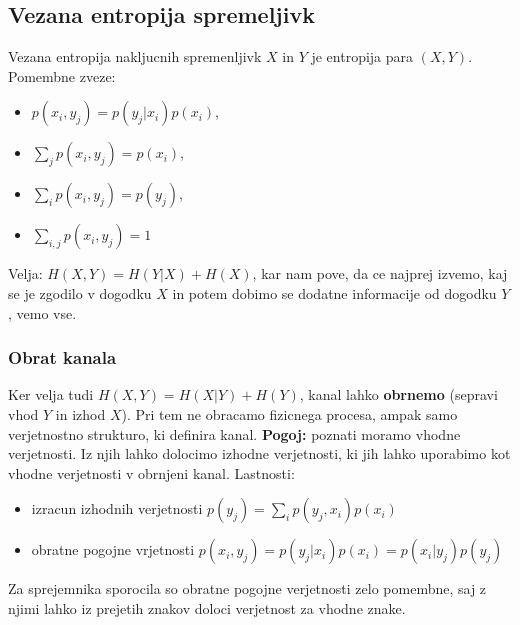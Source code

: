 \documentclass{article}
\begin{document}
\begin{multicols}{3}
\subsection{Vezana entropija spremeljivk}
Vezana entropija nakljucnih spremenljivk $X$ in $Y$ je entropija para $(X, Y)$.
Pomembne zveze:
\begin{itemize}
    \item $p(x_i, y_j) = p(y_j| x_i)p(x_i)$,
    \item $\sum_j p(x_i, y_j) = p(x_i)$,
    \item $\sum_i p(x_i, y_j) = p(y_j)$,
    \item $\sum_{i,j} p(x_i, y_j) = 1$
\end{itemize}
Velja: $H(X, Y) = H(Y|X) + H(X)$, kar nam pove, da ce najprej izvemo, kaj se je zgodilo v dogodku $X$ in potem
dobimo se dodatne informacije od dogodku $Y$, vemo vse.
\subsubsection{Obrat kanala}
Ker velja tudi $H(X, Y) = H(X|Y) + H(Y)$, kanal lahko \textbf{obrnemo}
(sepravi vhod $Y$ in izhod $X$). Pri tem ne obracamo fizicnega procesa, ampak samo verjetnostno strukturo, ki definira kanal. \textbf{Pogoj:}  poznati moramo vhodne verjetnosti. Iz njih lahko dolocimo izhodne verjetnosti, ki jih lahko
uporabimo kot vhodne verjetnosti v obrnjeni kanal.
Lastnosti:
\begin{itemize}
    \item izracun izhodnih verjetnosti $p(y_j) = \sum_i p(y_j, x_i)p(x_i)$
    \item obratne pogojne vrjetnosti $p(x_i, y_j)= p(y_j|x_i)p(x_i) = p(x_i|y_j)p(y_j)$
\end{itemize}
Za sprejemnika sporocila so obratne pogojne verjetnosti zelo pomembne, saj z njimi lahko iz prejetih znakov doloci
verjetnost za vhodne znake.


\end{multicols}
\end{document}
